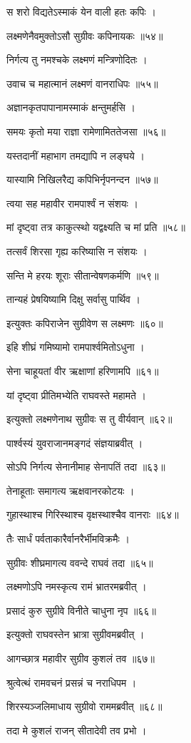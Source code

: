 स शरो विद्यतेऽस्माकं येन वाली हतः कपिः ।

लक्ष्मणेनैवमुक्तोऽसौ सुग्रीवः कपिनायकः ॥५४॥

निर्गत्य तु नमश्चके लक्ष्मणं मन्त्रिणोदितः ।

उवाच च महात्मानं लक्ष्मणं वानराधिपः ॥५५॥

अज्ञानकृतपापानामस्माकं क्षन्तुमर्हसि ।

समयः कृतो मया राज्ञा रामेणामिततेजसा ॥५६॥

यस्तदानीं महाभाग तमद्यापि न लङ्घये ।

यास्यामि निखिलरैद्य कपिभिर्नृपनन्दन ॥५७॥

त्वया सह महावीर रामपार्श्वं न संशयः ।

मां दृष्ट्वा तत्र काकुत्स्थो यद्वक्ष्यति च मां प्रति ॥५८॥

तत्सर्वं शिरसा गृह्य करिष्यासि न संशयः ।

सन्ति मे हरयः शूराः सीतान्वेषणकर्मणि ॥५९॥

तान्यहं प्रेषयिष्यामि दिक्षु सर्वासु पार्थिव ।

इत्युक्तः कपिराजेन सुग्रीवेण स लक्ष्मणः ॥६०॥

इहि शीघ्रं गमिष्यामो रामपार्श्वमितोऽधुना ।

सेना चाहूयतां वीर ऋक्षाणां हरिणामपि ॥६१॥

यां दृष्ट्वा प्रीतिमभ्येति राघवस्ते महामते ।

इत्युक्तो लक्ष्मणेनाथ सुग्रीवः स तु वीर्यवान् ॥६२॥

पार्श्वस्यं युवराजानमङ्गदं संज्ञयाब्रवीत् ।

सोऽपि निर्गत्य सेनानीमाह सेनापतिं तदा ॥६३॥

तेनाहूताः समागत्य ऋक्षवानरकोटयः ।

गुहास्थाश्च गिरिस्थाश्च वृक्षस्थाश्चैव वानराः ॥६४॥

तैः सार्धं पर्वताकारैर्वानरैर्भीमविक्रमैः ।

सुग्रीवः शीघ्रमागत्य ववन्दे राघवं तदा ॥६५॥

लक्ष्मणोऽपि नमस्कृत्य रामं भ्रातरमब्रवीत् ।

प्रसादं कुरु सुग्रीवे विनीते चाधुना नृप ॥६६॥

इत्युक्तो राघवस्तेन भ्रात्रा सुग्रीवमब्रवीत् ।

आगच्छात्र महावीर सुग्रीव कुशलं तव ॥६७॥

श्रुत्वेत्थं रामवचनं प्रसन्नं च नराधिपम ।

शिरस्यञ्जलिमाधाय सुग्रीवो राममब्रवीत् ॥६८॥

तदा मे कुशलं राजन् सीतादेवी तव प्रभो ।

